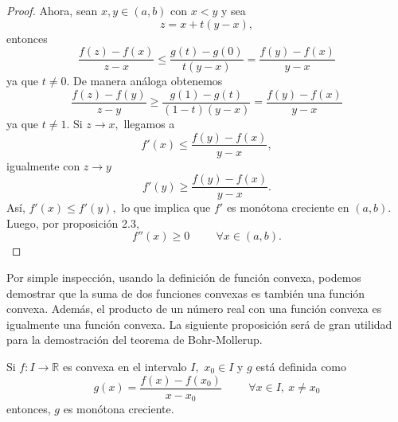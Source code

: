 \begin{proof}
	Ahora, sean $x, y \in (a,b)$ con $x<y$ y sea $$z = x+t(y-x),$$ entonces $$\frac{f(z)-f(x)}{z-x} \leq \frac{g(t)-g(0)}{t(y-x)} = \frac{f(y)-f(x)}{y-x}$$ ya que $t \neq 0.$ De manera análoga obtenemos $$\frac{f(z)-f(y)}{z-y} \geq \frac{g(1)-g(t)}{(1-t)(y-x)} = \frac{f(y)-f(x)}{y-x}$$ ya que $t \neq 1.$
	Si $z \rightarrow x,$ llegamos a $$f'(x) \leq \frac{f(y)-f(x)}{y-x},$$ igualmente con $z \rightarrow y$ $$f'(y) \geq \frac{f(y)-f(x)}{y-x}.$$ Así, $f'(x) \leq f'(y),$ lo que implica que $f'$ es monótona creciente en $(a,b).$ Luego, por proposición 2.3, $$f''(x) \geq 0 \hspace{1cm} \forall x \in (a,b).$$
\end{proof}
Por simple inspección, usando la definición de función convexa, podemos demostrar que la suma de dos funciones convexas es también una función convexa. Además, el producto de un número real con una función convexa es igualmente una función convexa. La siguiente proposición será de gran utilidad para la demostración del teorema de Bohr-Mollerup.
\begin{proposition}
	Si $f: I \rightarrow \mathbb{R}$ es convexa en el intervalo $I,$ $x_0 \in I$ y $g$ está definida como $$g(x) = \frac{f(x)-f(x_0)}{x-x_0} \hspace{1cm} \forall x \in I,\ x \neq x_0$$
	entonces, $g$ es monótona creciente.
\end{proposition}
